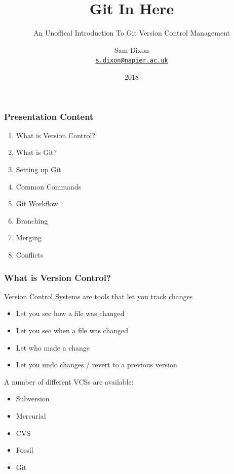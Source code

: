 \documentclass{beamer}
\title{Git In Here}
\subtitle{An Unoffical Introduction To Git Version Control Management}
\author{Sam Dixon\\
{\tt \href{mailto:s.dixon@napier.ac.uk}{s.dixon@napier.ac.uk}}}
\date{2018}
\begin{document}
\frame{\titlepage}
  
\begin{frame}
\frametitle{Presentation Content}
    \begin{enumerate}
    \item What is Version Control?
    \item What is Git?
    \item Setting up Git
    \item Common Commands
    \item Git Workflow
    \item Branching
    \item Merging
    \item Conflicts
    \end{enumerate}
\end{frame}

\begin{frame}
\frametitle{What is Version Control?}
    Version Control Systems are tools that let you track changes    
    \begin{itemize}
    \item Let you see how a file was changed
    \item Let you see when a file was changed
    \item Let who made a change
    \item Let you undo changes /  revert to a previous version
    \end{itemize}
\end{frame}

\begin{frame}
    A number of different VCSs are available:
    \begin{itemize}
    \item Subversion
    \item Mercurial
    \item CVS
    \item Fossil
    \item Git
    \end{itemize}
\end{frame}
\end{document}
